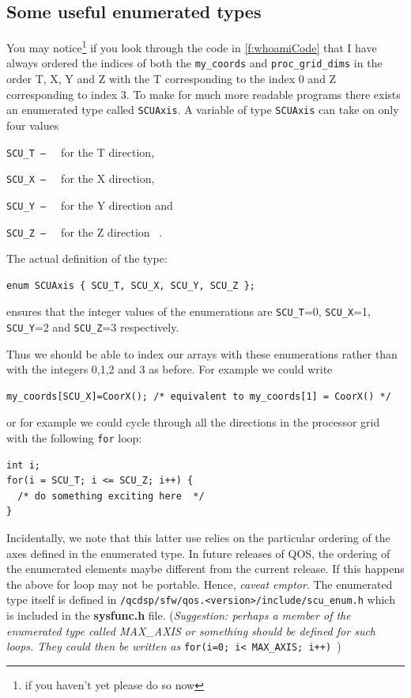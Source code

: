 \subsection{Some useful enumerated types}
You may notice\footnote{if you haven't yet please do so now}
if you look through the code in \ref{f:whoamiCode} that
I have always ordered the indices of both the {\tt my\_coords} and {\tt proc\_grid\_dims} in the order T, X, Y and Z with the T corresponding to the index
0 and Z corresponding to index 3. To make for much more
readable programs there exists an enumerated type called {\tt SCUAxis}.
A variable of type {\tt SCUAxis} can take on only four values
\begin{description}
\item{\tt SCU\_T -- \ } 
for the T direction,
\item{\tt SCU\_X -- \ } 
for the X direction,
\item{\tt SCU\_Y -- \ } 
for the Y direction and 
\item{\tt SCU\_Z -- \ } 
for the Z direction \ .
\end{description}
The actual definition of the type:
{\scriptsize \begin{verbatim}
enum SCUAxis { SCU_T, SCU_X, SCU_Y, SCU_Z };
\end{verbatim}}
ensures that the integer values of the enumerations
are {\tt SCU\_T}=0, {\tt SCU\_X}=1, {\tt SCU\_Y}=2 and {\tt SCU\_Z}=3
respectively. 

Thus we should be able to index our arrays with these enumerations
rather than with the integers 0,1,2 and 3 as before. For example
we could write
{\scriptsize \begin{verbatim}
my_coords[SCU_X]=CoorX(); /* equivalent to my_coords[1] = CoorX() */
\end{verbatim}} 
or for example we could cycle through all the directions in the 
processor grid with the following {\tt for} loop:
{\scriptsize \begin{verbatim}
int i;
for(i = SCU_T; i <= SCU_Z; i++) {
  /* do something exciting here  */
}
\end{verbatim}}

Incidentally, we note that this latter use relies on the particular
ordering of the axes defined in the enumerated type. In future releases
of QOS, the ordering of the enumerated elements maybe different from 
the current release. If this happens the above for loop may not be 
portable. Hence, {\em caveat emptor}. The enumerated type itself 
is defined in {\tt /qcdsp/sfw/qos.<version>/include/scu\_enum.h} which
is included in the {\bf sysfunc.h} file. ({\em Suggestion:
perhaps a member of the enumerated type called MAX\_AXIS or something
should be defined for such loops. They could then be written as
} {\tt for(i=0; i< MAX\_AXIS; i++) })


